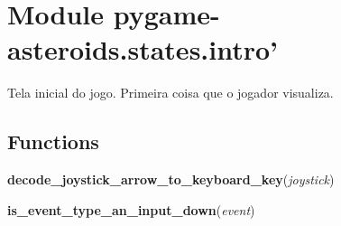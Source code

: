 %
%
%


\section{Module pygame-asteroids.states.intro'}

    \label{pygame-asteroids:states:intro'}
Tela inicial do jogo. Primeira coisa que o jogador visualiza.



  \subsection{Functions}

    \label{virtual_controller:decode_joystick_arrow_to_keyboard_key}

    \vspace{0.5ex}

\hspace{.8\funcindent}\begin{boxedminipage}{\funcwidth}

    \raggedright \textbf{decode\_joystick\_arrow\_to\_keyboard\_key}(\textit{joystick})

\setlength{\parskip}{2ex}
\setlength{\parskip}{1ex}
    \end{boxedminipage}

    \label{virtual_controller:is_event_type_an_input_down}

    \vspace{0.5ex}

\hspace{.8\funcindent}\begin{boxedminipage}{\funcwidth}

    \raggedright \textbf{is\_event\_type\_an\_input\_down}(\textit{event})

\setlength{\parskip}{2ex}
\setlength{\parskip}{1ex}
    \end{boxedminipage}

